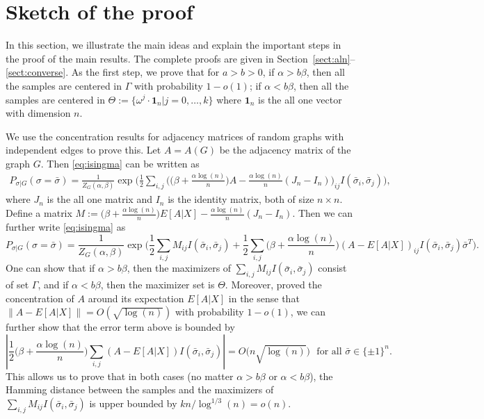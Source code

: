 \documentclass{article}
\begin{document}
\section{Sketch of the proof}
\label{sect:sketch}

In this section, we illustrate the main ideas and explain the important steps in the proof of the main results. The complete proofs are given in Section~\ref{sect:aln}--\ref{sect:converse}.
As the first step, we prove that for $a>b>0$, if $\alpha>b\beta$, then all the samples are centered in $\Gamma$ with probability $1-o(1)$; if $\alpha<b\beta$, then all the samples are centered in $\Theta := \{ \omega^j  \cdot \mathbf{1}_n | j=0, \dots,k\}$ where $\mathbf{1}_n$ is the all one vector with dimension $n$.

We use the concentration results for adjacency matrices of random graphs with independent edges to prove this. Let $A=A(G)$ be the adjacency matrix of the graph $G$. Then \eqref{eq:isingma} can be written as
\begin{align*}
 P_{\sigma|G}(\sigma=\bar{\sigma})  
=  \frac{1}{Z_G(\alpha,\beta)}
\exp\Big( \frac{1}{2} \sum_{i,j}\Big( \big(\beta+\frac{\alpha\log(n)}{n} \big) A
-\frac{\alpha\log(n)}{n} (J_n-I_n) \Big)_{ij} I(\bar{\sigma}_i,\bar{\sigma}_j) 
\Big)  ,
\end{align*}
where $J_n$ is the all one matrix and $I_n$ is the identity matrix, both of size $n\times n$.
Define a matrix
$
M:= \big(\beta+\frac{\alpha\log(n)}{n} \big) E[A|X]
-\frac{\alpha\log(n)}{n} (J_n-I_n).
$
Then we can further write \eqref{eq:isingma}
as
$$
P_{\sigma|G}(\sigma=\bar{\sigma})
= \frac{1}{Z_G(\alpha,\beta)}
\exp\Big( \frac{1}{2} \sum_{i,j} M_{ij} I(\bar{\sigma}_i, \bar{\sigma}_j) + \frac{1}{2} \sum_{i,j}\big(\beta+\frac{\alpha\log(n)}{n} \big)  (A-E[A|X])_{ij} I(\bar{\sigma}_i, \bar{\sigma}_j) 
  \bar{\sigma}^T 
\Big)  .
$$
One can show that if $\alpha>b\beta$, then the maximizers of $\sum_{i,j} M_{ij} I(\bar{\sigma}_i, \bar{\sigma}_j)$ consist of set $\Gamma$, and if $\alpha<b\beta$, then the maximizer set is $\Theta$.
Moreover, \cite{Hajek16} proved the concentration of $A$ around its expectation $E[A|X]$ in the sense that
$\|A-E[A|X]\| = O(\sqrt{\log(n)})$ with probability $1-o(1)$, we can further show that the error term above is bounded by
$$
\left|\frac{1}{2} \big(\beta+\frac{\alpha\log(n)}{n} \big)\sum_{i,j} (A-E[A|X])
 I( \bar{\sigma}_i, \bar{\sigma}_j) \right| = O \big( n \sqrt{\log(n)} \big)
  \text{~~for all~} \bar{\sigma}\in\{\pm 1\}^n  .
$$
This allows us to prove that in both cases (no matter $\alpha>b\beta$ or $\alpha<b\beta$), the Hamming distance between the samples and the maximizers of $\sum_{i,j}  M_{ij}I(\bar{\sigma}_i, \bar{\sigma}_j)$ is upper bounded by $kn/\log^{1/3}(n)=o(n)$.
\end{document}
